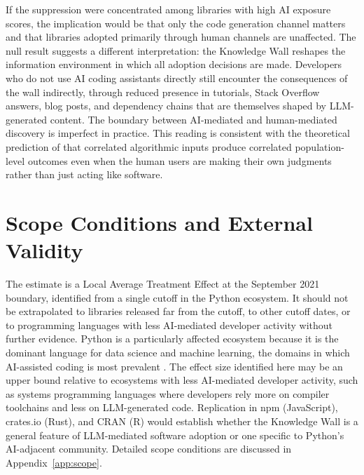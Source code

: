 \documentclass[12pt, a4paper]{report}
\begin{document}
If the suppression were concentrated among libraries with high AI exposure scores, the implication would be that only the code generation channel matters and that libraries adopted primarily through human channels are unaffected. The null result suggests a different interpretation: the Knowledge Wall reshapes the information environment in which all adoption decisions are made. Developers who do not use AI coding assistants directly still encounter the consequences of the wall indirectly, through reduced presence in tutorials, Stack Overflow answers, blog posts, and dependency chains that are themselves shaped by LLM-generated content. The boundary between AI-mediated and human-mediated discovery is imperfect in practice. This reading is consistent with the theoretical prediction of \citet{kleinberg2021algorithmic} that correlated algorithmic inputs produce correlated population-level outcomes even when the human users are making their own judgments rather than just acting like software.

\section{Scope Conditions and External Validity}\label{sec:disc-scope}
The estimate is a Local Average Treatment Effect at the September 2021 boundary, identified from a single cutoff in the Python ecosystem. It should not be extrapolated to libraries released far from the cutoff, to other cutoff dates, or to programming languages with less AI-mediated developer activity without further evidence. Python is a particularly affected ecosystem because it is the dominant language for data science and machine learning, the domains in which AI-assisted coding is most prevalent \citep{stackoverflow2024survey, daniotti2025who}. The effect size identified here may be an upper bound relative to ecosystems with less AI-mediated developer activity, such as systems programming languages where developers rely more on compiler toolchains and less on LLM-generated code. Replication in npm (JavaScript), crates.io (Rust), and CRAN (R) would establish whether the Knowledge Wall is a general feature of LLM-mediated software adoption or one specific to Python's AI-adjacent community. Detailed scope conditions are discussed in Appendix~\ref{app:scope}.
\end{document}
